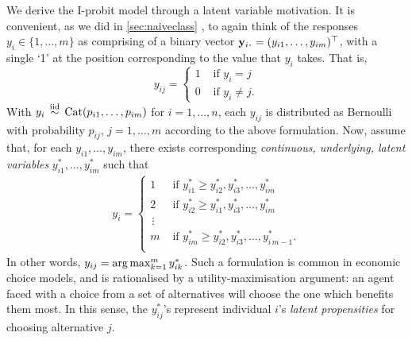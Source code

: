 We derive the I-probit model through a latent variable motivation.
It is convenient, as we did in \cref{sec:naiveclass} , to again think of the responses $y_i \in \{1,\dots,m\} $ as comprising of a binary vector $\by_{i \bigcdot} = (y_{i1},\dots,y_{im})^\top$, with a single `1' at the position corresponding to the value that $y_i$ takes. 
That is,
\[
  y_{ij} =
  \begin{cases}
    1 &\text{ if } y_i = j \\
    0 &\text{ if } y_i \neq j.
  \end{cases}
\]
With $y_i\,\overset{\text{iid}}{\sim}\,\operatorname{Cat}(p_{i1},\dots,p_{im})$ for $i=1,\dots,n$, each $y_{ij}$ is distributed as Bernoulli with probability $p_{ij}$, $j=1,\dots,m$ according to the above formulation. 
Now, assume that, for each $y_{i1}, \dots, y_{im}$, there exists corresponding \emph{continuous, underlying, latent variables} $y_{i1}^*, \dots, y_{im}^*$ such that
\begingroup
\setlength{\abovedisplayskip}{7pt}
\setlength{\belowdisplayskip}{12pt}
\begin{align}\label{eq:latentmodel}
  y_i =
  \begin{cases}
    1 &\text{ if } y_{i1}^* \geq y_{i2}^*, y_{i3}^*, \dots, y_{im}^* \\
    2 &\text{ if } y_{i2}^* \geq y_{i1}^*, y_{i3}^*, \dots, y_{im}^* \\
    \,\vdots \\
    m &\text{ if } y_{im}^* \geq y_{i2}^*, y_{i3}^*, \dots, y_{i\,m-1}^*. \\
  \end{cases}  
\end{align}
\endgroup
In other words, 
$y_{ij} = \operatorname*{arg\,max}_{k=1}^m y_{ik}^*$.
Such a formulation is common in economic choice models, and is rationalised by a utility-maximisation argument: an agent faced with a choice from a set of alternatives will choose the one which benefits them most.
In this sense, the $y_{ij}^*$'s represent individual $i$'s \emph{latent propensities} for choosing alternative $j$.

